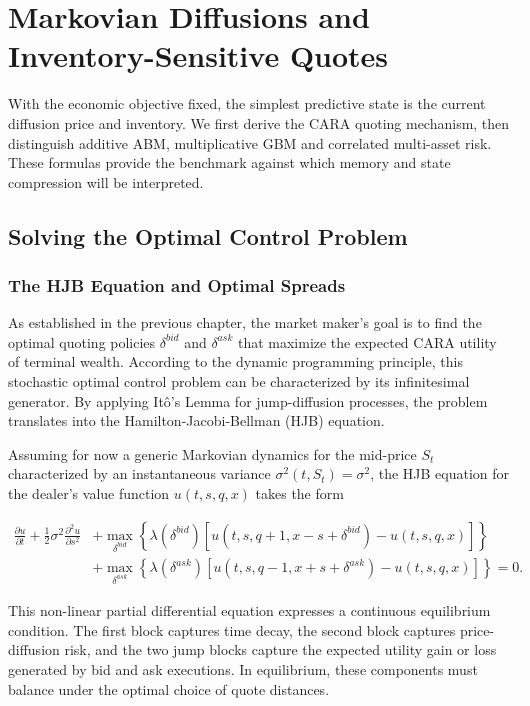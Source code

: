 \chapter{Markovian Diffusions and Inventory-Sensitive Quotes}\label{ch:markov}
With the economic objective fixed, the simplest predictive state is the current diffusion price and inventory. We first derive the CARA quoting mechanism, then distinguish additive ABM, multiplicative GBM and correlated multi-asset risk. These formulas provide the benchmark against which memory and state compression will be interpreted.
\section{Solving the Optimal Control Problem}


\subsection{The HJB Equation and Optimal Spreads}\label{sec:classical-hjb}
As established in the previous chapter, the market maker's goal is to find the optimal quoting policies $\delta^{bid}$ and $\delta^{ask}$ that maximize the expected CARA utility of terminal wealth. According to the dynamic programming principle, this stochastic optimal control problem can be characterized by its infinitesimal generator. By applying Itô's Lemma for jump-diffusion processes, the problem translates into the Hamilton-Jacobi-Bellman (HJB) equation.

Assuming for now a generic Markovian dynamics for the mid-price $S_t$ characterized by an instantaneous variance $\sigma^2(t,S_t)=\sigma^2$, the HJB equation for the dealer's value function $u(t,s,q,x)$ takes the form

\begin{align*}
    \frac{\partial u}{\partial t} + \frac{1}{2}\sigma^2 \frac{\partial^2 u}{\partial s^2} &+ \max_{\delta^{bid}} \left\{ \lambda(\delta^{bid}) [u(t, s, q+1, x - s + \delta^{bid}) - u(t,s,q,x)] \right\} \\
    &+ \max_{\delta^{ask}} \left\{ \lambda(\delta^{ask}) [u(t, s, q-1, x + s + \delta^{ask}) - u(t,s,q,x)] \right\} = 0.
\end{align*}

This non-linear partial differential equation expresses a continuous equilibrium condition. The first block captures time decay, the second block captures price-diffusion risk, and the two jump blocks capture the expected utility gain or loss generated by bid and ask executions. In equilibrium, these components must balance under the optimal choice of quote distances. 

